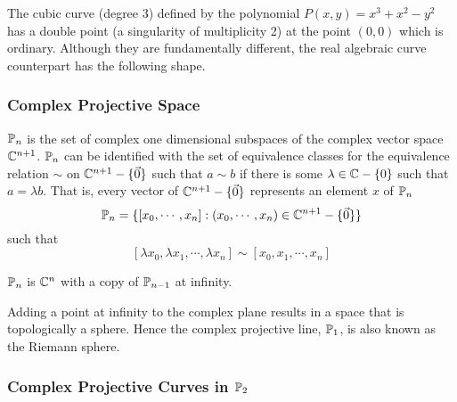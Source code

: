 \begin{example}
    The cubic curve (degree 3) defined by the polynomial $P(x,y)=x^3+x^2-y^2$ has a double point (a singularity of multiplicity 2) at the point $(0,0)$ which is ordinary.
    Although they are fundamentally different, the real algebraic curve counterpart has the following shape.
    \begin{center}
    \end{center}
\end{example}

\subsubsection{Complex Projective Space}

\begin{definition}
    $\mathbb P_n$ is the set of complex one dimensional subspaces of the complex vector space $\mathbb C^{n+1}$. $\mathbb P_n$ can be identified with the set of equivalence classes for the equivalence relation $\sim$ on $\mathbb C^{n+1}-\{\vec{0}\}$ such that $a\sim b$ if there is some $\lambda\in\mathbb C-\{0\}$ such that $a=\lambda b$. That is, every vector of $\mathbb C^{n+1}-\{\vec{0}\}$ represents an element $x$ of $\mathbb P_n$
    $$\mathbb P_n=\{[x_0,\cdots,x_n]:(x_0,\cdots,x_n)\in\mathbb C^{n+1}-\{\vec{0}\}\}$$
    such that
    $$[\lambda x_0,\lambda x_1,\cdots,\lambda x_n]\sim[x_0,x_1,\cdots,x_n]$$
\end{definition}

\begin{remark}
    $\mathbb P_n$ is $\mathbb C^n$ with a copy of $\mathbb P_{n-1}$ at infinity.
\end{remark}

\begin{example}
    Adding a point at infinity to the complex plane results in a space that is topologically a sphere. Hence the complex projective line, $\mathbb P_1$, is also known as the Riemann sphere.
\end{example}

\subsubsection{Complex Projective Curves in $\mathbb P_2$}

